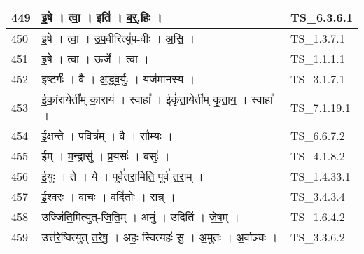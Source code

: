 \documentclass[17pt]{extarticle}
\begin{document}
\begin{longtable}{||p{0.4in}||p{4.9in}||p{0.9in}||}
    \hline
        
    449 & इ॒षे   ।   त्वा॒   ।   इति॑   ।   ब॒र्॒.हिः   ।    & TS\_6.3.6.1       \\
    
    \hline
        
    450 & इ॒षे   ।   त्वा॒   ।   उ॒प॒वीरित्यु॑प{-}वीः   ।   अ॒सि॒   ।    & TS\_1.3.7.1       \\
    
    \hline
        
    451 & इ॒षे   ।   त्वा॒   ।   ऊ॒र्जे   ।   त्वा॒   ।    & TS\_1.1.1.1       \\
    
    \hline
        
    452 & इ॒ष्टर्गः॑   ।   वै   ।   अ॒द्ध्व॒र्युः   ।   यज॑मानस्य   ।    & TS\_3.1.7.1       \\
    
    \hline
        
    453 & ई॒कां॒रायेती᳚म्{-}का॒राय॑   ।   स्वाहा᳚   ।   ईकृं॑ता॒येती᳚म्{-}कृ॒ता॒य॒   ।   स्वाहा᳚   ।    & TS\_7.1.19.1       \\
    
    \hline
        
    454 & ई॒क्ष॒न्ते॒   ।   प॒वित्र᳚म्   ।   वै   ।   सौ॒म्यः   ।    & TS\_6.6.7.2       \\
    
    \hline
        
    455 & ई॒म्   ।   म॒न्द्रासु॑   ।   प्र॒यसः॑   ।   वसुः॑   ।    & TS\_4.1.8.2       \\
    
    \hline
        
    456 & ई॒युः   ।   ते   ।   ये   ।   पूर्व॑तरा॒मिति॒ पूर्व॑{-}त॒रा॒म्   ।    & TS\_1.4.33.1       \\
    
    \hline
        
    457 & ई॒श्व॒रः   ।   वा॒चः   ।   वदि॑तोः   ।   सन्न्   ।    & TS\_3.4.3.4       \\
    
    \hline
        
    458 & उज्जि॑ति॒मित्युत्{-}जि॒ति॒म्   ।   अनु॑   ।   उदिति॑   ।   जे॒ष॒म्   ।    & TS\_1.6.4.2       \\
    
    \hline
        
    459 & उत्त॑रे॒ष्वित्युत्{-}त॒रे॒षु॒   ।   अहः॒ स्वित्यहः॑{-}सु॒   ।   अ॒मुतः॑   ।   अ॒र्वाञ्चः॑   ।    & TS\_3.3.6.2       \\
    

\end{longtable}
\end{document}
